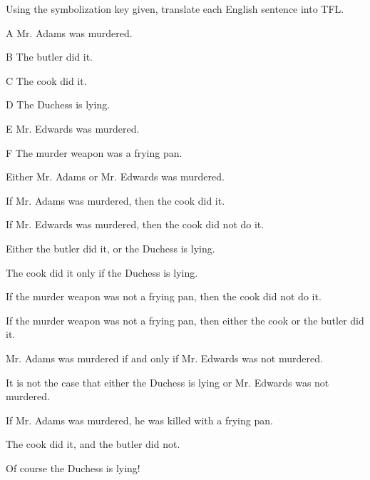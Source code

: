 \problempart Using the symbolization key given, translate each English sentence into TFL.
\begin{ekey}
\item[A] Mr. Adams was murdered.
\item[B] The butler did it.
\item[C] The cook did it.
\item[D] The Duchess is lying.
\item[E] Mr. Edwards was murdered.
\item[F] The murder weapon was a frying pan.
\end{ekey}

\begin{earg}
\item Either Mr. Adams or Mr. Edwards was murdered.
\item If Mr. Adams was murdered, then the cook did it.
\item If Mr. Edwards was murdered, then the cook did not do it.
\item Either the butler did it, or the Duchess is lying.
\item The cook did it only if the Duchess is lying. 
\item If the murder weapon was not a frying pan, then the cook did not do it.
\item If the murder weapon was not a frying pan, then either the cook or the butler did it.
\item Mr. Adams was murdered if and only if Mr. Edwards was not murdered.
\item It is not the case that either the Duchess is lying or Mr. Edwards was not murdered.
\item If Mr. Adams was murdered, he was killed with a frying pan.
\item The cook did it, and the butler did not.
\item Of course the Duchess is lying!
\end{earg}

